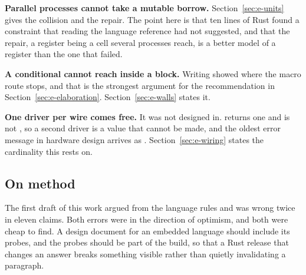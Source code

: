\textbf{Parallel processes cannot take a mutable borrow.}
Section~\ref{sec:e-units} gives the collision and the repair. The point
here is that ten lines of Rust found a constraint that reading the language
reference had not suggested, and that the repair, a register being a cell
several processes reach, is a better model of a register than the one that
failed.

\textbf{A  conditional cannot reach inside a block.}
Writing  showed where the macro route stops, and that is the
strongest argument for the recommendation in
Section~\ref{sec:e-elaboration}. Section~\ref{sec:e-walls} states it.

\textbf{One driver per wire comes free.} It was not designed in.
 returns one  and  is not ,
so a second driver is a value that cannot be made, and the oldest error
message in hardware design arrives as . Section~\ref{sec:e-wiring} states the cardinality this rests on.

\subsection{On method}

The first draft of this work argued from the language rules and was wrong
twice in eleven claims. Both errors were in the direction of optimism, and
both were cheap to find. A design document for an embedded language should
include its probes, and the probes should be part of the build, so that a
Rust release that changes an answer breaks something visible rather than
quietly invalidating a paragraph.
